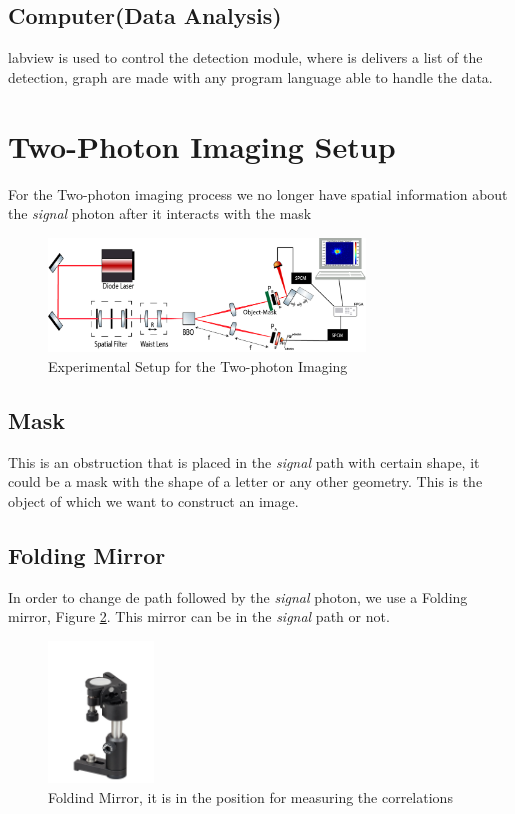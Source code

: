 \subsection{Computer(Data Analysis)}
labview is used to control the detection module, where is delivers a list of the detection, graph are made with any 
program language able to handle the data.


\section{Two-Photon Imaging Setup}
For the Two-photon imaging process we no longer have spatial information about the \textit{signal} photon after it interacts
with the mask  

\begin{figure}[h!]
\centering
\includegraphics[width=0.75\textwidth]{Figures/ghostSetup.png}
\caption{Experimental Setup for the Two-photon Imaging} 
\label{fig:ghostSetup}
\end{figure}

\subsection{Mask}
This is an obstruction that is placed in the \textit{signal} path with certain shape, it could be a mask with the shape of a letter or any other geometry. This is the object 
of which we want to construct an image.
\subsection{Folding Mirror}
In order to change de path followed by the \textit{signal} photon, we use a Folding mirror, Figure \ref{fig:foldingMirror}.
This mirror can be in the \textit{signal} path or not.
\begin{figure}[h]
\centering
 \includegraphics[width=0.25\textwidth]{Figures/foldingMirror.jpg}
 \caption{Foldind Mirror, it is in the position for measuring the correlations}
\label{fig:foldingMirror} 
\end{figure}

